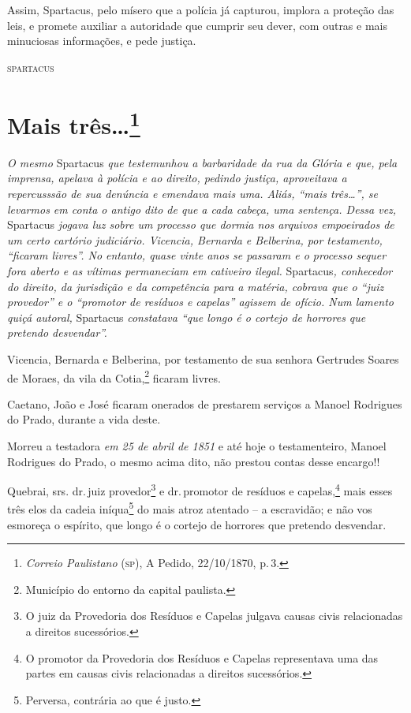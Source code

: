 Assim, Spartacus, pelo mísero que a polícia já capturou, implora a
proteção das leis, e promete auxiliar a autoridade que cumprir seu
dever, com outras e mais minuciosas informações, e pede justiça.

\begin{flushright}
\textsc{spartacus}
\end{flushright}

\chapter{Mais três\ldots{}\footnote{\emph{Correio Paulistano} (\textsc{sp}), A Pedido, 22/10/1870,
  p.\,3.}} %

\begin{didascalia}
\emph{O mesmo} Spartacus \emph{que testemunhou a barbaridade da rua da
Glória e que, pela imprensa, apelava à polícia e ao direito, pedindo
justiça, aproveitava a repercusssão de sua denúncia e emendava mais uma.
Aliás, ``mais três\ldots{}'', se levarmos em conta o antigo dito de que a cada
cabeça, uma sentença. Dessa vez,} Spartacus \emph{jogava luz sobre um
processo que dormia nos arquivos empoeirados de um certo cartório
judiciário. Vicencia, Bernarda e Belberina, por testamento, ``ficaram
livres''. No entanto, quase vinte anos se passaram e o processo sequer
fora aberto e as vítimas permaneciam em cativeiro ilegal.}
Spartacus\emph{, conhecedor do direito, da jurisdição e da competência
para a matéria, cobrava que o ``juiz provedor'' e o ``promotor de resíduos
e capelas'' agissem de ofício. Num lamento quiçá autoral,} Spartacus
\emph{constatava ``que longo é o cortejo de horrores que pretendo
desvendar''.}
\end{didascalia}


Vicencia, Bernarda e Belberina, por testamento de sua senhora Gertrudes
Soares de Moraes, da vila da Cotia,\footnote{ Município do entorno da
  capital paulista.} ficaram livres.

Caetano, João e José ficaram onerados de prestarem serviços a Manoel
Rodrigues do Prado, durante a vida deste.

Morreu a testadora \emph{em 25 de abril de 1851} e até hoje o
testamenteiro, Manoel Rodrigues do Prado, o mesmo acima dito, não
prestou contas desse encargo!!

Quebrai, srs. dr.\,juiz provedor\footnote{ O juiz da Provedoria dos
  Resíduos e Capelas julgava causas civis relacionadas a direitos
  sucessórios.} e dr.\,promotor de resíduos e capelas,\footnote{ O
  promotor da Provedoria dos Resíduos e Capelas representava uma das
  partes em causas civis relacionadas a direitos sucessórios.} mais
esses três elos da cadeia iníqua\footnote{ Perversa, contrária ao que é
  justo.} do mais atroz atentado -- a escravidão; e não vos esmoreça o
espírito, que longo é o cortejo de horrores que pretendo desvendar.

